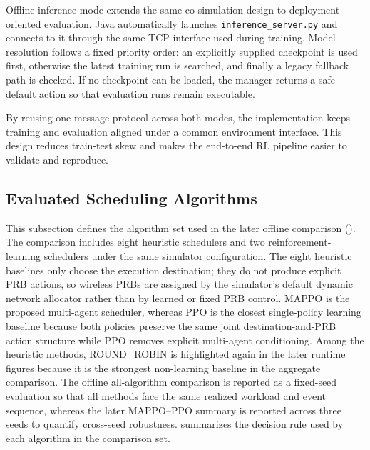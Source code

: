 Offline inference mode extends the same co-simulation design to deployment-oriented evaluation. Java automatically launches \texttt{inference\_server.py} and connects to it through the same TCP interface used during training. Model resolution follows a fixed priority order: an explicitly supplied checkpoint is used first, otherwise the latest training run is searched, and finally a legacy fallback path is checked. If no checkpoint can be loaded, the manager returns a safe default action so that evaluation runs remain executable.

By reusing one message protocol across both modes, the implementation keeps training and evaluation aligned under a common environment interface. This design reduces train-test skew and makes the end-to-end RL pipeline easier to validate and reproduce.

\subsection{Evaluated Scheduling Algorithms}
\label{subsec:baseline-algorithms}

This subsection defines the algorithm set used in the later offline comparison (). The comparison includes eight heuristic schedulers and two reinforcement-learning schedulers under the same simulator configuration. The eight heuristic baselines only choose the execution destination; they do not produce explicit PRB actions, so wireless PRBs are assigned by the simulator's default dynamic network allocator rather than by learned or fixed PRB control. MAPPO is the proposed multi-agent scheduler, whereas PPO is the closest single-policy learning baseline because both policies preserve the same joint destination-and-PRB action structure while PPO removes explicit multi-agent conditioning. Among the heuristic methods, ROUND\_ROBIN is highlighted again in the later runtime figures because it is the strongest non-learning baseline in the aggregate comparison. The offline all-algorithm comparison is reported as a fixed-seed evaluation so that all methods face the same realized workload and event sequence, whereas the later MAPPO--PPO summary is reported across three seeds to quantify cross-seed robustness.  summarizes the decision rule used by each algorithm in the comparison set.

